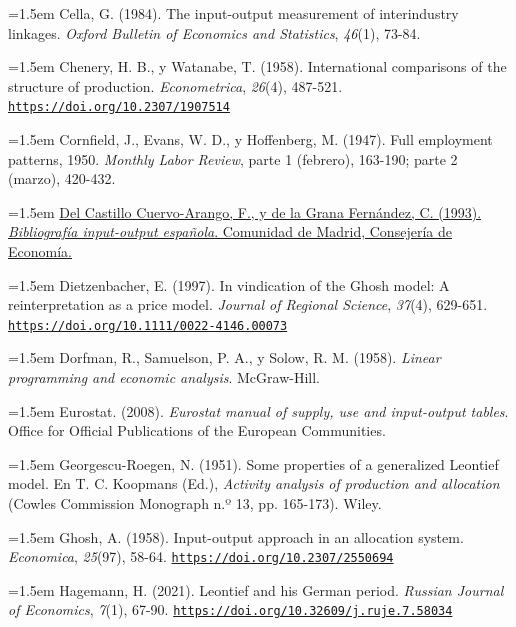 \documentclass[10pt,a4paper]{article}
\begin{document}
\noindent\hangindent=1.5em Cella, G. (1984). The input-output measurement of interindustry linkages. \textit{Oxford Bulletin of Economics and Statistics}, \textit{46}(1), 73-84.

\noindent\hangindent=1.5em Chenery, H. B., y Watanabe, T. (1958). International comparisons of the structure of production. \textit{Econometrica}, \textit{26}(4), 487-521. \href{https://doi.org/10.2307/1907514}{\nolinkurl{https://doi.org/10.2307/1907514}}

\noindent\hangindent=1.5em Cornfield, J., Evans, W. D., y Hoffenberg, M. (1947). Full employment patterns, 1950. \textit{Monthly Labor Review}, parte 1 (febrero), 163-190; parte 2 (marzo), 420-432.

\noindent\hangindent=1.5em \href{https://gestiona.comunidad.madrid/iestadis/fijas/informes/descarga/biblioio.pdf}{Del Castillo Cuervo-Arango, F., y de la Grana Fernández, C. (1993). \textit{Bibliografía input-output española}. Comunidad de Madrid, Consejería de Economía.}

\noindent\hangindent=1.5em Dietzenbacher, E. (1997). In vindication of the Ghosh model: A reinterpretation as a price model. \textit{Journal of Regional Science}, \textit{37}(4), 629-651. \href{https://doi.org/10.1111/0022-4146.00073}{\nolinkurl{https://doi.org/10.1111/0022-4146.00073}}

\noindent\hangindent=1.5em Dorfman, R., Samuelson, P. A., y Solow, R. M. (1958). \textit{Linear programming and economic analysis}. McGraw-Hill.

\noindent\hangindent=1.5em Eurostat. (2008). \textit{Eurostat manual of supply, use and input-output tables}. Office for Official Publications of the European Communities.

\noindent\hangindent=1.5em Georgescu-Roegen, N. (1951). Some properties of a generalized Leontief model. En T. C. Koopmans (Ed.), \textit{Activity analysis of production and allocation} (Cowles Commission Monograph n.º 13, pp. 165-173). Wiley.

\noindent\hangindent=1.5em Ghosh, A. (1958). Input-output approach in an allocation system. \textit{Economica}, \textit{25}(97), 58-64. \href{https://doi.org/10.2307/2550694}{\nolinkurl{https://doi.org/10.2307/2550694}}

\noindent\hangindent=1.5em Hagemann, H. (2021). Leontief and his German period. \textit{Russian Journal of Economics}, \textit{7}(1), 67-90. \href{https://doi.org/10.32609/j.ruje.7.58034}{\nolinkurl{https://doi.org/10.32609/j.ruje.7.58034}}
\end{document}
